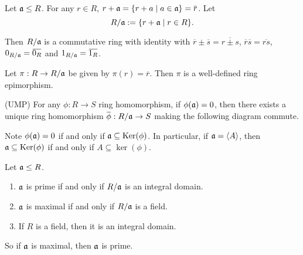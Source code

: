 \begin{construction}\label{1.13}
    Let $\mathfrak{a} \leq R$. For any $r \in R$, $r+\ffa = \{r + a \mid a \in \ffa\} = \overbar r$. Let 
    \[R/\mathfrak{a} := \{r + \mathfrak{a} \mid r \in R\}.\] 
    \par Then $R/\mathfrak{a}$ is a commutative ring with identity with $\overbar r \pm \overbar s = \overbar {r \pm s}$, $\overbar r \overbar s = \overbar{rs}$, $0_{R/\ffa} = \overbar {0_R}$ and $1_{R/\ffa} = \overbar {1_R}$. \par
    Let $\pi: R \to R/\mathfrak{a}$ be given by $\pi(r) = \overbar r$. Then $\pi$ is a well-defined ring epimorphism. \par 
    (UMP) For any $\phi: R \to S$ ring homomorphism, if $\phi(\mathfrak{a}) = 0$, then there exists a unique ring homomorphism $\overbar \phi: R/\ffa \to S$ making the following diagram commute. 
    \begin{center} 
    \end{center}
    \par
    Note $\phi(\mathfrak{a}) = 0$ if and only if $\mathfrak{a} \subseteq \operatorname{Ker}(\phi)$. In particular, if $\mathfrak{a} = \langle A \rangle$, then $\mathfrak{a} \subseteq \operatorname{Ker}(\phi)$ if and only if $A \subseteq \ker(\phi)$.
\end{construction}

\begin{fact}\label{1.14}
    Let $\mathfrak{a} \leq R$. 
    \begin{enumerate}
        \item\label{1.14a} $\mathfrak{a}$ is prime if and only if $R/\mathfrak{a}$ is an integral domain.
        \item\label{1.14b} $\mathfrak{a}$ is maximal if and only if $R/\mathfrak{a}$ is a field.
        \item\label{1.14c} If $R$ is a field, then it is an integral domain. 
    \end{enumerate}
    So if $\mathfrak{a}$ is maximal, then $\mathfrak{a}$ is prime.
\end{fact}

